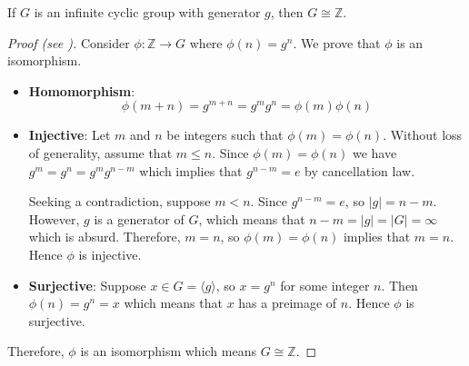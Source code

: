\begin{theorem}
    If $G$ is an infinite cyclic group with generator $g$, then $G \cong \mathbb{Z}$.
\end{theorem}
\begin{proof}[Proof (see \cite{proofwiki_infinitecyclicgrp})]
    Consider $\phi: \mathbb{Z} \to G$ where $\phi(n) = g^n$. We prove that $\phi$ is an isomorphism.
    \begin{itemize}
        \item \textbf{Homomorphism}:
        \[
            \phi(m+n) = g^{m+n} = g^mg^n = \phi(m)\phi(n)
        \]

        \item \textbf{Injective}: Let $m$ and $n$ be integers such that $\phi(m) = \phi(n)$. Without loss of generality, assume that $m \leq n$. Since $\phi(m) = \phi(n)$ we have $g^m = g^n = g^mg^{n-m}$ which implies that $g^{n-m} = e$ by cancellation law.

        Seeking a contradiction, suppose $m < n$. Since $g^{n-m} = e$, so $|g| = n - m$. However, $g$ is a generator of $G$, which means that $n - m = |g| = |G| = \infty$ which is absurd. Therefore, $m = n$, so $\phi(m) = \phi(n)$ implies that $m = n$. Hence $\phi$ is injective.

        \item \textbf{Surjective}: Suppose $x \in G = \langle g\rangle$, so $x = g^n$ for some integer $n$. Then $\phi(n) = g^n = x$ which means that $x$ has a preimage of $n$. Hence $\phi$ is surjective.
    \end{itemize}

    Therefore, $\phi$ is an isomorphism which means $G \cong \mathbb{Z}$.
\end{proof}

